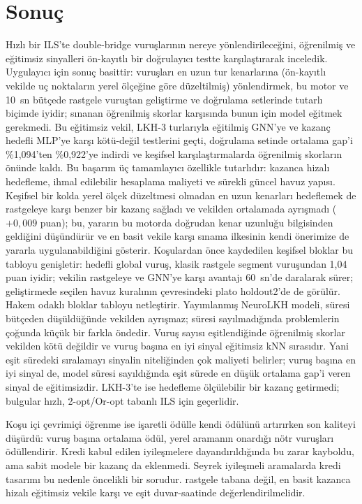 \section{Sonuç}\label{sec:sonuc}

Hızlı bir ILS'te double-bridge vuruşlarının nereye yönlendirileceğini, öğrenilmiş ve eğitimsiz
sinyalleri ön-kayıtlı bir doğrulayıcı testte karşılaştırarak inceledik. Uygulayıcı için sonuç
basittir: vuruşları en uzun tur kenarlarına (ön-kayıtlı vekilde uç noktaların yerel ölçeğine göre
düzeltilmiş) yönlendirmek, bu motor ve 10~sn bütçede rastgele vuruştan geliştirme ve doğrulama
setlerinde tutarlı biçimde iyidir; sınanan öğrenilmiş skorlar karşısında bunun için model eğitmek
gerekmedi. Bu eğitimsiz vekil, LKH-3 turlarıyla eğitilmiş GNN'ye ve kazanç hedefli MLP'ye karşı
kötü-değil testlerini geçti, doğrulama setinde ortalama gap'i \%1,094'ten \%0,922'ye indirdi ve
keşifsel karşılaştırmalarda öğrenilmiş skorların önünde kaldı.
Bu başarım üç tamamlayıcı özellikle tutarlıdır: kazanca hizalı hedefleme, ihmal edilebilir
hesaplama maliyeti ve sürekli güncel havuz yapısı. Keşifsel bir kolda yerel ölçek düzeltmesi olmadan en
uzun kenarları hedeflemek de rastgeleye karşı benzer bir kazanç sağladı ve vekilden ortalamada
ayrışmadı ($+0{,}009$ puan); bu, yararın bu motorda doğrudan kenar uzunluğu bilgisinden geldiğini
düşündürür ve en basit vekile karşı sınama ilkesinin kendi önerimize de yararla uygulanabildiğini
gösterir.
Koşulardan önce kaydedilen keşifsel bloklar bu tabloyu genişletir: hedefli global vuruş, klasik
rastgele segment vuruşundan 1,04 puan iyidir; vekilin rastgeleye ve GNN'ye karşı avantajı 60~sn'de
daralarak sürer; geliştirmede seçilen havuz kuralının çevresindeki plato holdout2'de de görülür.
Hakem odaklı bloklar tabloyu netleştirir. Yayımlanmış NeuroLKH modeli, süresi bütçeden düşüldüğünde
vekilden ayrışmaz; süresi sayılmadığında problemlerin çoğunda küçük bir farkla öndedir. Vuruş sayısı
eşitlendiğinde öğrenilmiş skorlar vekilden kötü değildir ve vuruş başına en iyi sinyal eğitimsiz kNN
sırasıdır. Yani eşit süredeki sıralamayı sinyalin niteliğinden çok maliyeti belirler; vuruş başına en iyi
sinyal de, model süresi sayıldığında eşit sürede en düşük ortalama gap'i veren sinyal de eğitimsizdir. LKH-3'te ise hedefleme ölçülebilir bir kazanç getirmedi; bulgular hızlı,
2-opt/Or-opt tabanlı ILS için geçerlidir.

Koşu içi çevrimiçi öğrenme ise işaretli ödülle kendi ödülünü artırırken son kaliteyi düşürdü: vuruş
başına ortalama ödül, yerel aramanın onardığı nötr vuruşları ödüllendirir. Kredi kabul edilen
iyileşmelere dayandırıldığında bu zarar kayboldu, ama sabit modele bir kazanç da eklenmedi. Seyrek
iyileşmeli aramalarda kredi tasarımı bu nedenle öncelikli bir sorudur.
rastgele tabana değil, en basit kazanca hizalı eğitimsiz vekile karşı ve eşit duvar-saatinde
değerlendirilmelidir.


